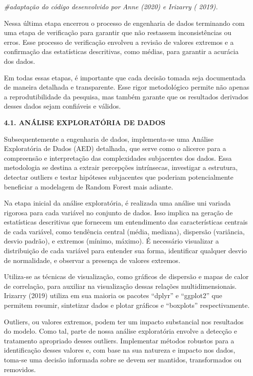 \documentclass[
]{article}
\newenvironment{Shaded}{\begin{snugshade}}{\end{snugshade}}
\newcommand{\CommentTok}[1]{\textcolor[rgb]{0.56,0.35,0.01}{\textit{#1}}}
\begin{document}
\begin{Shaded}
\begin{Highlighting}[]
\CommentTok{\#adaptação do código desenvolvido por Anne (2020) e Irizarry ( 2019).}
\end{Highlighting}
\end{Shaded}

Nessa última etapa encerrou o processo de engenharia de dados terminando
com uma etapa de verificação para garantir que não restassem
inconsistências ou erros. Esse processo de verificação envolveu a
revisão de valores extremos e a confirmação das estatísticas
descritivas, como médias, para garantir a acurácia dos dados.

Em todas essas etapas, é importante que cada decisão tomada seja
documentada de maneira detalhada e transparente. Esse rigor metodológico
permite não apenas a reprodutibilidade da pesquisa, mas também garante
que os resultados derivados desses dados sejam confiáveis e válidos.

\textbf{4.1. ANÁLISE EXPLORATÓRIA DE DADOS}

Subsequentemente a engenharia de dados, implementa-se uma Análise
Exploratória de Dados (AED) detalhada, que serve como o alicerce para a
compreensão e interpretação das complexidades subjacentes dos dados.
Essa metodologia se destina a extrair percepções intrínsecas, investigar
a estrutura, detectar outliers e testar hipóteses subjacentes que
poderiam potencialmente beneficiar a modelagem de Random Forest mais
adiante.

Na etapa inicial da análise exploratória, é realizada uma análise uni
variada rigorosa para cada variável no conjunto de dados. Isso implica
na geração de estatísticas descritivas que fornecem um entendimento das
características centrais de cada variável, como tendência central
(média, mediana), dispersão (variância, desvio padrão), e extremos
(mínimo, máximo). É necessário visualizar a distribuição de cada
variável para entender sua forma, identificar qualquer desvio de
normalidade, e observar a presença de valores extremos.

Utiliza-se as técnicas de visualização, como gráficos de dispersão e
mapas de calor de correlação, para auxiliar na visualização dessas
relações multidimensionais. Irizarry (2019) utiliza em sua maioria os
pacotes ``dplyr'' e ``ggplot2'' que permitem resumir, sintetizar dados e
plotar gráficos e ``boxplots'' respectivamente.

Outliers, ou valores extremos, podem ter um impacto substancial nos
resultados do modelo. Como tal, parte de nossa análise exploratória
envolve a detecção e tratamento apropriado desses outliers. Implementar
métodos robustos para a identificação desses valores e, com base na sua
natureza e impacto nos dados, toma-se uma decisão informada sobre se
devem ser mantidos, transformados ou removidos.
\end{document}
